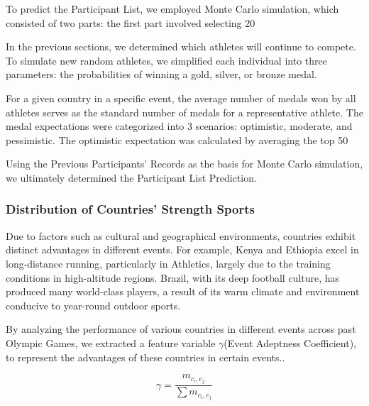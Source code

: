 \documentclass[12pt]{article}  %
\begin{document}
To predict the Participant List, we employed Monte Carlo simulation, which consisted of two parts: the first part involved selecting 20%

In the previous sections, we determined which athletes will continue to compete. To simulate new random athletes, we simplified each individual into three parameters: the probabilities of winning a gold, silver, or bronze medal.

For a given country in a specific event, the average number of medals won by all athletes serves as the standard number of medals for a representative athlete. The medal expectations were categorized into 3 scenarios: optimistic, moderate, and pessimistic. The optimistic expectation was calculated by averaging the top 50%

Using the Previous Participants' Records as the basis for Monte Carlo simulation, we ultimately determined the Participant List Prediction.



\subsubsection{Distribution of Countries' Strength Sports}
Due to factors such as cultural and geographical environments, countries exhibit distinct advantages in different events. For example, Kenya and Ethiopia excel in long-distance running, particularly in Athletics, largely due to the training conditions in high-altitude regions. Brazil, with its deep football culture, has produced many world-class players, a result of its warm climate and environment conducive to year-round outdoor sports.

By analyzing the performance of various countries in different events across past Olympic Games, we extracted a feature variable $\gamma$(Event Adeptness Coefficient), to represent the advantages of these countries in certain events..

\begin{equation}
	\gamma = \frac{m_{c_i,e_j}}{\sum m_{c_i,e_j}}
\end{equation}
\end{document}
